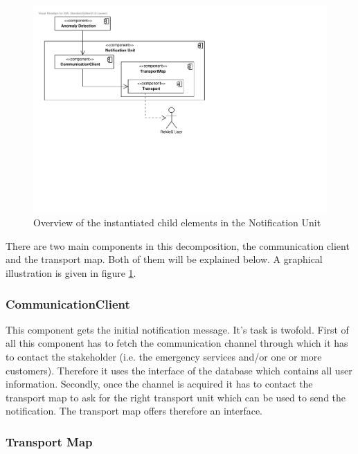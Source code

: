 \begin{figure}[H]
	\begin{centering}
		\includegraphics[width=\textwidth]{figs/add-it8-elements.pdf}
		\caption{Overview of the instantiated child elements in the Notification Unit}
		\label{fig:it8/elements}
	\end{centering}
\end{figure}

\npar There are two main components in this decomposition, the communication
client and the transport map. Both of them will be explained below. A graphical
illustration is given in figure \ref{fig:it8/elements}.

\subsubsection{CommunicationClient} 
\npar This component gets the initial notification message. It's task is
twofold. First of all this component has to fetch the communication channel
through which it has to contact the stakeholder (i.e. the emergency services
and/or one or more customers). Therefore it uses the
 interface of the database which contains all user
information. Secondly, once the channel is acquired it has to contact the
transport map to ask for the right transport unit which can be used to send the
notification. The transport map offers therefore an 
interface.

\subsubsection{Transport Map}

